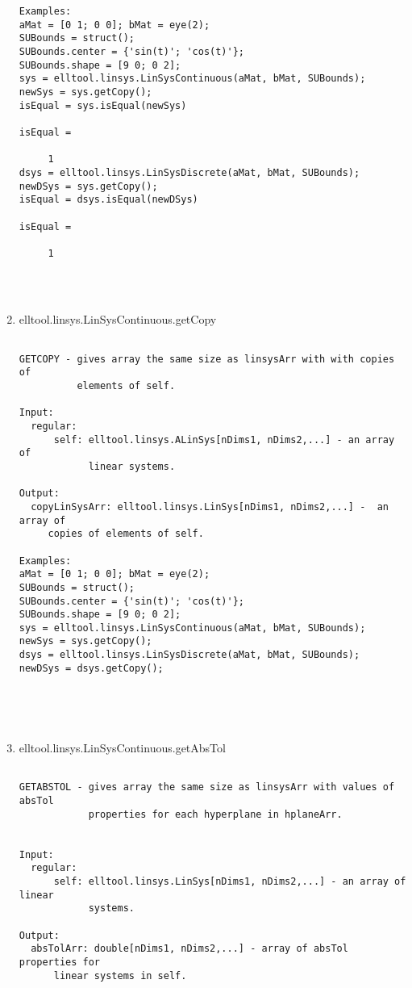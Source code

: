 \begin{enumerate}
\begin{lstlisting}
Examples:
aMat = [0 1; 0 0]; bMat = eye(2);
SUBounds = struct();
SUBounds.center = {'sin(t)'; 'cos(t)'};
SUBounds.shape = [9 0; 0 2];
sys = elltool.linsys.LinSysContinuous(aMat, bMat, SUBounds);
newSys = sys.getCopy();
isEqual = sys.isEqual(newSys)

isEqual =

     1
dsys = elltool.linsys.LinSysDiscrete(aMat, bMat, SUBounds);
newDSys = sys.getCopy();
isEqual = dsys.isEqual(newDSys)

isEqual =

     1




\end{lstlisting}
\fontfamily{\familydefault}
\selectfont
\item {elltool.linsys.LinSysContinuous.getCopy}
\selectfont
\begin{lstlisting}

GETCOPY - gives array the same size as linsysArr with with copies of
          elements of self.

Input:
  regular:
      self: elltool.linsys.ALinSys[nDims1, nDims2,...] - an array of
            linear systems.

Output:
  copyLinSysArr: elltool.linsys.LinSys[nDims1, nDims2,...] -  an array of
     copies of elements of self.

Examples:
aMat = [0 1; 0 0]; bMat = eye(2);
SUBounds = struct();
SUBounds.center = {'sin(t)'; 'cos(t)'};
SUBounds.shape = [9 0; 0 2];
sys = elltool.linsys.LinSysContinuous(aMat, bMat, SUBounds);
newSys = sys.getCopy();
dsys = elltool.linsys.LinSysDiscrete(aMat, bMat, SUBounds);
newDSys = dsys.getCopy();





\end{lstlisting}
\fontfamily{\familydefault}
\selectfont
\item {elltool.linsys.LinSysContinuous.getAbsTol}
\selectfont
\begin{lstlisting}

GETABSTOL - gives array the same size as linsysArr with values of absTol
            properties for each hyperplane in hplaneArr.


Input:
  regular:
      self: elltool.linsys.LinSys[nDims1, nDims2,...] - an array of linear
            systems.

Output:
  absTolArr: double[nDims1, nDims2,...] - array of absTol properties for
      linear systems in self.


\end{lstlisting}
\end{enumerate}
